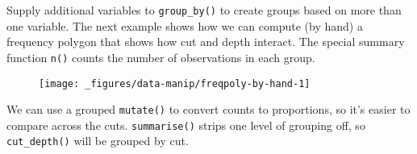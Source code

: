 Supply additional variables to \texttt{group\_by()} to create groups
based on more than one variable. The next example shows how we can
compute (by hand) a frequency polygon that shows how cut and depth
interact. The special summary function \texttt{n()} counts the number of
observations in each group.

\begin{Shaded}
\begin{Highlighting}[]
\StringTok{ }\NormalTok{(} \NormalTok{())}
\StringTok{ }\StringTok{ }\StringTok{ }\NormalTok{)}
\CommentTok{#> }

 \StringTok{ }
\StringTok{  }\NormalTok{()}
\end{Highlighting}
\end{Shaded}

\begin{figure}[H]
  \centering
  \texttt{[image: \_figures/data-manip/freqpoly-by-hand-1]}
\end{figure}

We can use a grouped \texttt{mutate()} to convert counts to proportions,
so it's easier to compare across the cuts. \texttt{summarise()} strips
one level of grouping off, so \texttt{cut\_depth()} will be grouped by
cut.

\begin{Shaded}
\begin{Highlighting}[]
\StringTok{ } \StringTok{ }
 \StringTok{ }
\StringTok{  }\NormalTok{()}
\end{Highlighting}
\end{Shaded}

